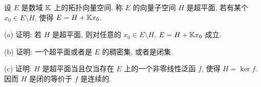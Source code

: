 

\begin{exercise}
    设 $E$ 是数域 $\mathbb{K}$ 上的拓扑向量空间. 称 $E$ 的向量子空间 $H$ 是超平面,
    若有某个 $x_0\in E\setminus H$, 使得 $E=H+\mathbb{K} x_0$.

    (a) 证明: 若 $H$ 是超平面, 则对任意的 $x_0\in E\setminus H$, $E=H+\mathbb{K} x_0$ 成立.

    (b) 证明: 一个超平面或者是 $E$ 的稠密集, 或者是闭集.

    (c) 证明: $H$ 是超平面当且仅当存在 $E$ 上的一个非零线性泛函 $f$,
    使得 $H=\ker f$. 因而 $H$ 是闭的等价于 $f$ 是连续的.
\end{exercise}

